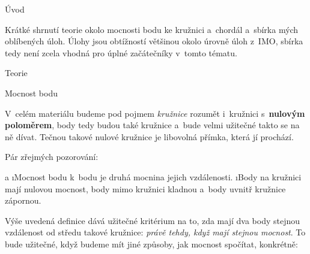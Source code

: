 

\let\angle\sphericalangle





\sec Úvod

Krátké shrnutí teorie okolo mocnosti bodu ke kružnici a~chordál a~sbírka mých oblíbených úloh. Úlohy jsou obtížností většinou okolo úrovně úloh z~IMO, sbírka tedy není zcela vhodná pro úplné začátečníky v~tomto tématu.

\sec Teorie

\secc Mocnost bodu

V~celém materiálu budeme pod pojmem \textit{kružnice} rozumět i~kružnici s~\textbf{nulovým poloměrem}, body tedy budou také kružnice a~bude velmi užitečné takto se na ně dívat. Tečnou takové nulové kružnice je libovolná přímka, která jí prochází.


Pár zřejmých pozorování:

\begitems \style a
\i Mocnost bodu k~bodu je druhá mocnina jejich vzdálenosti.
\i Body na kružnici mají nulovou mocnost, body mimo kružnici kladnou a~body uvnitř kružnice zápornou.
\enditems

Výše uvedená definice dává užitečné kritérium na to, zda mají dva body stejnou vzdálenost od středu takové kružnice: \textit{právě tehdy, když mají stejnou mocnost}. To bude užitečné, když budeme mít jiné způsoby, jak mocnost spočítat, konkrétně:


